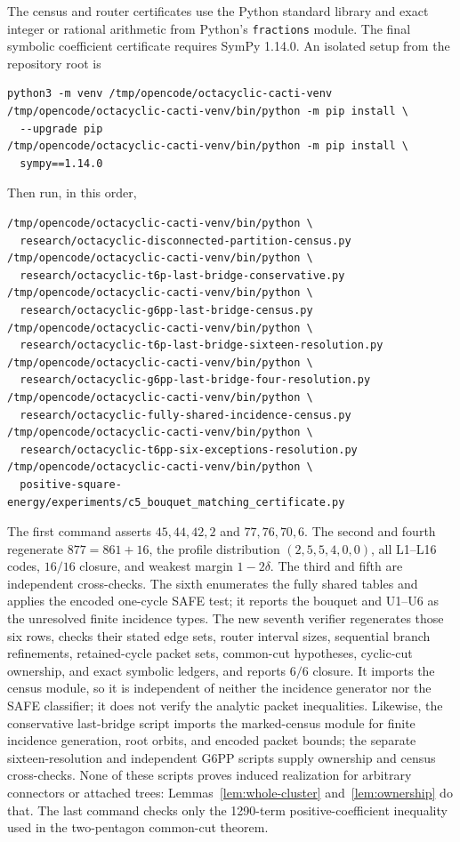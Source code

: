 \documentclass[11pt]{article}
\begin{document}
The census and router certificates use the Python standard library and exact
integer or rational arithmetic from Python's \texttt{fractions} module.  The final symbolic
coefficient certificate requires SymPy 1.14.0.  An isolated setup from the
repository root is
\begin{verbatim}
python3 -m venv /tmp/opencode/octacyclic-cacti-venv
/tmp/opencode/octacyclic-cacti-venv/bin/python -m pip install \
  --upgrade pip
/tmp/opencode/octacyclic-cacti-venv/bin/python -m pip install \
  sympy==1.14.0
\end{verbatim}
Then run, in this order,
\begin{verbatim}
/tmp/opencode/octacyclic-cacti-venv/bin/python \
  research/octacyclic-disconnected-partition-census.py
/tmp/opencode/octacyclic-cacti-venv/bin/python \
  research/octacyclic-t6p-last-bridge-conservative.py
/tmp/opencode/octacyclic-cacti-venv/bin/python \
  research/octacyclic-g6pp-last-bridge-census.py
/tmp/opencode/octacyclic-cacti-venv/bin/python \
  research/octacyclic-t6p-last-bridge-sixteen-resolution.py
/tmp/opencode/octacyclic-cacti-venv/bin/python \
  research/octacyclic-g6pp-last-bridge-four-resolution.py
/tmp/opencode/octacyclic-cacti-venv/bin/python \
  research/octacyclic-fully-shared-incidence-census.py
/tmp/opencode/octacyclic-cacti-venv/bin/python \
  research/octacyclic-t6pp-six-exceptions-resolution.py
/tmp/opencode/octacyclic-cacti-venv/bin/python \
  positive-square-energy/experiments/c5_bouquet_matching_certificate.py
\end{verbatim}
The first command asserts $45,44,42,2$ and $77,76,70,6$.  The second and
fourth regenerate $877=861+16$, the profile distribution $(2,5,5,4,0,0)$,
all L1--L16 codes, $16/16$ closure, and weakest margin $1-2\delta$.  The third
and fifth are independent cross-checks.  The sixth enumerates the fully shared
tables and applies the encoded one-cycle SAFE test; it reports the bouquet and
U1--U6 as the unresolved finite incidence types.  The new seventh verifier
regenerates those six rows, checks their stated edge sets, router interval
sizes, sequential branch refinements, retained-cycle packet sets, common-cut
hypotheses, cyclic-cut ownership, and exact symbolic ledgers, and reports
$6/6$ closure.  It imports the census module, so it is independent of neither
the incidence generator nor the SAFE classifier; it does not verify the
analytic packet inequalities.  Likewise, the conservative last-bridge script
imports the marked-census module for finite incidence generation, root orbits,
and encoded packet bounds; the separate sixteen-resolution and independent
G6PP scripts supply ownership and census cross-checks.  None of these scripts
proves induced realization for arbitrary connectors or attached trees:
Lemmas~\ref{lem:whole-cluster} and~\ref{lem:ownership} do that.  The last
command checks only the 1290-term positive-coefficient inequality used in the
two-pentagon common-cut theorem.
\end{document}

